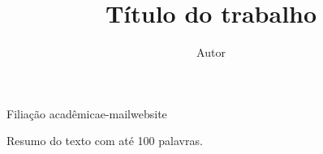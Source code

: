\documentclass{article}
\begin{document}
\graphicspath{{figs/}}

\title{Título do trabalho}
\author{Autor}{Filiação acadêmica}{e-mail}{website}

\begin{sumario}
  Resumo do texto com até 100 palavras.  
\end{sumario}




\renewcommand{\refname}{Referências Bibliográficas}


\end{document}
